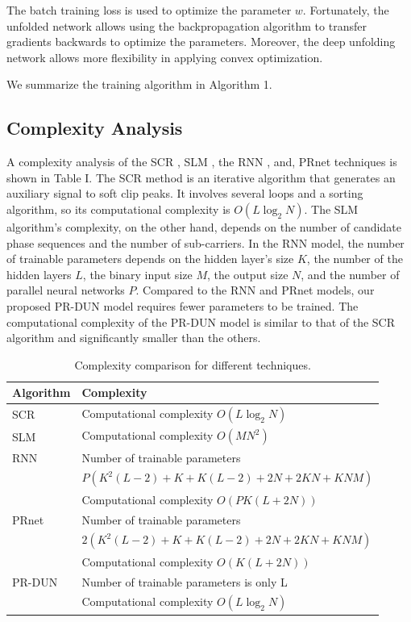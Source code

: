 \documentclass[conference]{IEEEtran}
\begin{document}
The batch training loss is used to optimize the parameter $w$. Fortunately, the unfolded network allows using the backpropagation algorithm to transfer gradients backwards to optimize the parameters. Moreover, the deep unfolding network allows more flexibility in applying convex optimization.

We summarize the training algorithm in Algorithm 1.

\subsection{Complexity Analysis}
A complexity analysis of the SCR \cite{b1}, SLM \cite{b11}, the RNN \cite{b8}, and, PRnet \cite{b7} techniques is shown in Table I. The SCR method is an iterative algorithm that generates an auxiliary signal to soft clip peaks. It involves several loops and a sorting algorithm, so its computational complexity is $O(L \log_2 N)$. The SLM algorithm’s complexity, on the other hand, depends on the number of candidate phase sequences and the number of sub-carriers. In the RNN model, the number of trainable parameters depends on the hidden layer’s size $K$, the number of the hidden layers $L$, the binary input size $M$, the output size $N$, and the number of parallel neural networks $P$. Compared to the RNN and PRnet models, our proposed PR-DUN model requires fewer parameters to be trained. The computational complexity of the PR-DUN model is similar to that of the SCR algorithm and significantly smaller than the others.

\begin{table}[htbp]
\caption{Complexity comparison for different techniques.}
\begin{center}
\begin{tabular}{|l|l|}
\hline
\textbf{Algorithm} & \textbf{Complexity} \\
\hline
SCR \cite{b1} & Computational complexity $O(L \log_2 N)$ \\
\hline
SLM \cite{b11} & Computational complexity $O(M N^2)$ \\
\hline
RNN \cite{b8} & Number of trainable parameters \\
& $P (K^2(L - 2) + K + K(L - 2) + 2N + 2KN + KNM)$ \\
& Computational complexity $O(P K(L + 2N))$ \\
\hline
PRnet \cite{b7} & Number of trainable parameters \\
& $2(K^2(L - 2) + K + K(L - 2) + 2N + 2KN + KNM)$ \\
& Computational complexity $O(K(L + 2N))$ \\
\hline
PR-DUN & Number of trainable parameters is only L \\
& Computational complexity $O(L \log_2 N)$ \\
\hline
\end{tabular}
\end{center}
\end{table}
\end{document}
